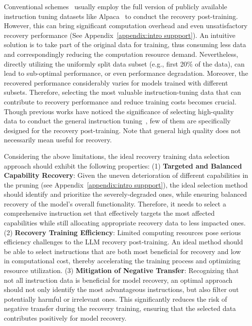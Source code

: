Conventional schemes~\citep{ma2023llm} usually employ the full version of publicly available instruction tuning datasets like Alpaca~\citep{alpaca2023} to conduct the recovery post-training. However, this can bring significant computation overhead and even unsatisfactory recovery performance (See Appendix~\ref{appendix:intro suppport}). %
An intuitive solution is to take part of the original data for training, thus consuming less data and correspondingly reducing the computation resource demand. Nevertheless, directly utilizing the uniformly split data subset (e.g., first 20\% of the data), can lead to sub-optimal performance, or even performance degradation. Moreover, the recovered performance considerably varies for models trained with different subsets. Therefore, selecting the most valuable instruction-tuning data that can contribute to recovery performance and reduce training costs becomes crucial. Though previous works have noticed the significance of selecting high-quality data to conduct the general instruction tuning~\citep{wang2024survey}, few of them are specifically designed for the recovery post-training. Note that general high quality does not necessarily mean useful for recovery.

Considering the above limitations, the ideal recovery training data selection approach should exhibit the following properties: 
(1) \textbf{Targeted and Balanced Capability Recovery}: %
Given the uneven deterioration of different capabilities in the pruning (see Appendix~\ref{appendix:intro suppport}), the ideal selection method should identify and prioritize the severely-degraded ones, while ensuring balanced recovery of the model's overall functionality. Therefore, it needs to select a comprehensive instruction set that effectively targets the most affected capabilities while still allocating appropriate recovery data to less impacted ones.
(2) \textbf{Recovery Training Efficiency}: Limited computing resources pose serious efficiency challenges to the LLM recovery post-training.
An ideal method should be able to select instructions that are both most beneficial for recovery and low in computational cost, thereby accelerating the training process and optimizing resource utilization. (3) \textbf{Mitigation of Negative Transfer}: 
Recognizing that not all instruction data is beneficial for model recovery, an optimal approach should not only identify the most advantageous instructions, but also filter out potentially harmful or irrelevant ones.
This significantly reduces the risk of negative transfer during the recovery training, ensuring that the selected data contributes positively for model recovery.

